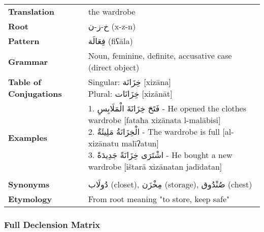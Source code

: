 \documentclass[letter,12pt]{article}
\begin{document}
\begin{tabular}{p{3cm}p{10cm}}
\toprule
\textbf{Translation} & the wardrobe \\
\textbf{Root} & \textarabic{خ-ز-ن} (x-z-n) \\
\textbf{Pattern} & \textarabic{فِعَالَة} (fiʕāla) \\
\textbf{Grammar} & Noun, feminine, definite, accusative case (direct object) \\
\textbf{Table of Conjugations} & \makecell[l]{
Singular: \textarabic{خِزَانَة} [xizāna]\\
Plural: \textarabic{خِزَانَات} [xizānāt]
} \\
\textbf{Examples} & \makecell[l]{\parbox{9.5cm}{
1. \textarabic{فَتَحَ خِزَانَةَ الْمَلَابِسِ} - He opened the clothes wardrobe [fataħa xizānata l-malābisi]\\
2. \textarabic{الْخِزَانَةُ مَلِيئَةٌ} - The wardrobe is full [al-xizānatu malīʔatun]\\
3. \textarabic{اشْتَرَى خِزَانَةً جَدِيدَةً} - He bought a new wardrobe [ištarā xizānatan jadīdatan]
}} \\
\midrule \\
\textbf{Synonyms} & \textarabic{دُولَاب} (closet), \textarabic{مِخْزَن} (storage), \textarabic{صُنْدُوق} (chest) \\
\textbf{Etymology} & From root meaning "to store, keep safe" \\
\bottomrule
\end{tabular}

\subsubsection*{Full Declension Matrix}
\end{document}
